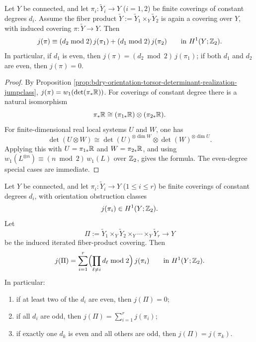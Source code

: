 
\begin{proposition}\label{prop:bdry-orientation-jumpclass-fiberproduct-multiplicativity}
Let \(Y\) be connected, and let \(\pi_i:\widetilde Y_i\to Y\) (\(i=1,2\)) be finite coverings of constant degrees \(d_i\).
Assume the fiber product \(\widetilde Y:=\widetilde Y_1\times_Y\widetilde Y_2\) is again a covering over \(Y\), with induced covering \(\pi:\widetilde Y\to Y\).
Then
\[
j(\pi)\equiv (d_2\bmod 2)\,j(\pi_1)+(d_1\bmod 2)\,j(\pi_2)\qquad\text{in }H^1(Y;\mathbb{Z}_2).
\]
In particular, if \(d_1\) is even, then \(j(\pi)=(d_2\bmod 2)\,j(\pi_1)\); if both \(d_1\) and \(d_2\) are even, then \(j(\pi)=0\).
\end{proposition}

\begin{proof}
By Proposition \ref{prop:bdry-orientation-torsor-determinant-realization-jumpclass},
\(
j(\pi)=w_1(\det(\pi_\ast\mathbb{R}))
\).
For coverings of constant degree there is a natural isomorphism
\[
\pi_\ast\mathbb{R}\cong (\pi_{1\ast}\mathbb{R})\otimes(\pi_{2\ast}\mathbb{R}).
\]
For finite-dimensional real local systems \(U\) and \(W\), one has
\[
\det(U\otimes W)\cong \det(U)^{\otimes \dim W}\otimes \det(W)^{\otimes \dim U}.
\]
Applying this with \(U=\pi_{1\ast}\mathbb{R}\) and \(W=\pi_{2\ast}\mathbb{R}\), and using
\(
w_1(L^{\otimes n})\equiv (n\bmod 2)\,w_1(L)
\)
over \(\mathbb{Z}_2\), gives the formula.
The even-degree special cases are immediate. \qedhere
\end{proof}

\begin{theorem}\label{thm:bdry-orientation-iterated-fiberproduct-parity}
Let \(Y\) be connected, and let \(\pi_i:\widetilde Y_i\to Y\) (\(1\le i\le r\)) be finite coverings of constant degrees \(d_i\), with orientation obstruction classes
\[
j(\pi_i)\in H^1(Y;\mathbb{Z}_2).
\]
Let
\[
\Pi:=\widetilde Y_1\times_Y\widetilde Y_2\times_Y\cdots\times_Y\widetilde Y_r\longrightarrow Y
\]
be the induced iterated fiber-product covering.
Then
\[
j(\Pi)=\sum_{i=1}^r\Bigl(\prod_{\ell\neq i} d_\ell \bmod 2\Bigr)\,j(\pi_i)
\qquad\text{in }H^1(Y;\mathbb{Z}_2).
\]
In particular:
\begin{enumerate}
\normalfont
  \item if at least two of the \(d_i\) are even, then \(j(\Pi)=0\);
  \item if all \(d_i\) are odd, then \(j(\Pi)=\sum_{i=1}^r j(\pi_i)\);
  \item if exactly one \(d_k\) is even and all others are odd, then \(j(\Pi)=j(\pi_k)\).
\end{enumerate}
\end{theorem}

